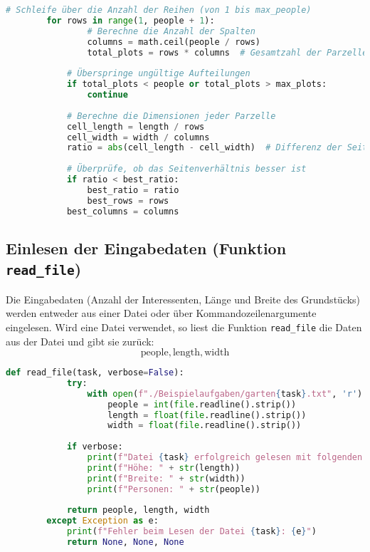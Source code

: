 \documentclass[a4paper,10pt,ngerman]{scrartcl}
\begin{document}
	\begin{lstlisting}[language=Python, caption=Berechnung der optimalen Parzellenaufteilung]
	    # Schleife über die Anzahl der Reihen (von 1 bis max_people)
		for rows in range(1, people + 1):
				# Berechne die Anzahl der Spalten
				columns = math.ceil(people / rows)
				total_plots = rows * columns  # Gesamtzahl der Parzellen
				
			# Überspringe ungültige Aufteilungen
			if total_plots < people or total_plots > max_plots:
				continue
			
			# Berechne die Dimensionen jeder Parzelle
			cell_length = length / rows
			cell_width = width / columns
			ratio = abs(cell_length - cell_width)  # Differenz der Seitenlängen als Maß für das Verhältnis
			
			# Überprüfe, ob das Seitenverhältnis besser ist
			if ratio < best_ratio:
				best_ratio = ratio
				best_rows = rows
			best_columns = columns

	\end{lstlisting}
	
	\subsection{Einlesen der Eingabedaten (Funktion \texttt{read\_file})}
	
	Die Eingabedaten (Anzahl der Interessenten, Länge und Breite des Grundstücks) werden entweder aus einer Datei oder über Kommandozeilenargumente eingelesen. Wird eine Datei verwendet, so liest die Funktion \texttt{read\_file} die Daten aus der Datei und gibt sie zurück:
	\[
	\text{people}, \text{length}, \text{width}
	\]
	
	\begin{lstlisting}[language=Python, caption=Einlesen der Eingabedaten]
		def read_file(task, verbose=False):
			try:
				with open(f"./Beispielaufgaben/garten{task}.txt", 'r') as file:
					people = int(file.readline().strip())
					length = float(file.readline().strip())
					width = float(file.readline().strip())
				
			if verbose:
				print(f"Datei {task} erfolgreich gelesen mit folgenden Werten: ")
				print(f"Höhe: " + str(length))
				print(f"Breite: " + str(width))
				print(f"Personen: " + str(people))
			
			return people, length, width
		except Exception as e:
			print(f"Fehler beim Lesen der Datei {task}: {e}")
			return None, None, None

	\end{lstlisting}
	
\end{document}
